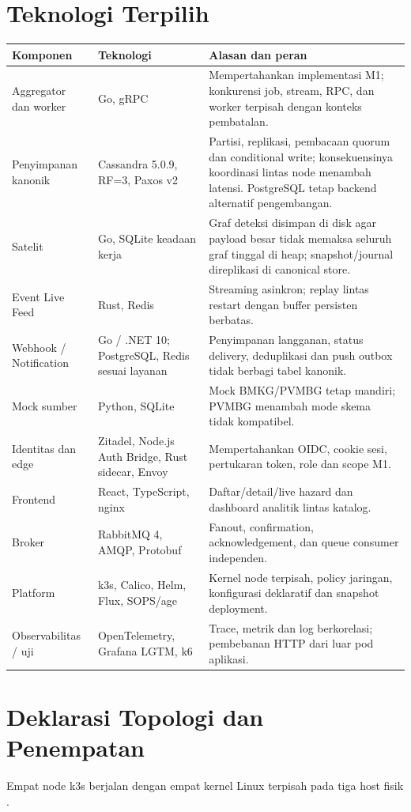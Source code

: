 \section{Teknologi Terpilih}
\begin{longtable}{@{}P{3.1cm}P{3.4cm}P{8.9cm}@{}}
\toprule Komponen & Teknologi & Alasan dan peran\\\midrule\endhead
Aggregator dan worker & Go, gRPC & Mempertahankan implementasi M1; konkurensi job, stream, RPC, dan worker terpisah dengan konteks pembatalan.\\
Penyimpanan kanonik & Cassandra 5.0.9, RF=3, Paxos v2 & Partisi, replikasi, pembacaan quorum dan conditional write; konsekuensinya koordinasi lintas node menambah latensi. PostgreSQL tetap backend alternatif pengembangan.\\
Satelit & Go, SQLite keadaan kerja & Graf deteksi disimpan di disk agar payload besar tidak memaksa seluruh graf tinggal di heap; snapshot/journal direplikasi di canonical store.\\
Event Live Feed & Rust, Redis & Streaming asinkron; replay lintas restart dengan buffer persisten berbatas.\\
Webhook / Notification & Go / .NET 10; PostgreSQL, Redis sesuai layanan & Penyimpanan langganan, status delivery, deduplikasi dan push outbox tidak berbagi tabel kanonik.\\
Mock sumber & Python, SQLite & Mock BMKG/PVMBG tetap mandiri; PVMBG menambah mode skema tidak kompatibel.\\
Identitas dan edge & Zitadel, Node.js Auth Bridge, Rust sidecar, Envoy & Mempertahankan OIDC, cookie sesi, pertukaran token, role dan scope M1.\\
Frontend & React, TypeScript, nginx & Daftar/detail/live hazard dan dashboard analitik lintas katalog.\\
Broker & RabbitMQ 4, AMQP, Protobuf & Fanout, confirmation, acknowledgement, dan queue consumer independen.\\
Platform & k3s, Calico, Helm, Flux, SOPS/age & Kernel node terpisah, policy jaringan, konfigurasi deklaratif dan snapshot deployment.\\
Observabilitas / uji & OpenTelemetry, Grafana LGTM, k6 & Trace, metrik dan log berkorelasi; pembebanan HTTP dari luar pod aplikasi.\\\bottomrule
\end{longtable}

\section{Deklarasi Topologi dan Penempatan}
Empat node k3s berjalan dengan empat kernel Linux terpisah pada tiga host fisik .

